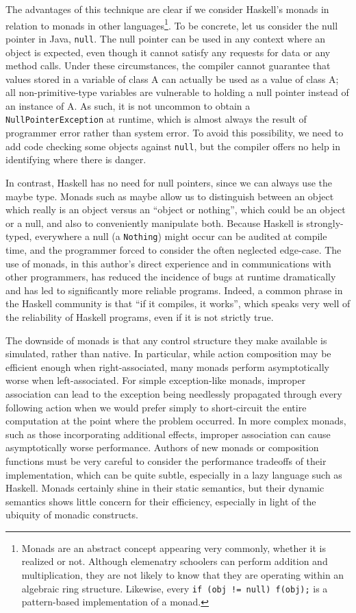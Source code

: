\documentclass[11pt]{article}
\begin{document}
The advantages of this technique are clear if we consider Haskell's monads in relation to monads in other languages\footnote{Monads are an abstract concept appearing very commonly, whether it is realized or not. Although elemenatry schoolers can perform addition and multiplication, they are not likely to know that they are operating within an algebraic ring structure. Likewise, every \texttt{if (obj != null) f(obj);} is a pattern-based implementation of a monad.}.
To be concrete, let us consider the null pointer in Java, \texttt{null}.
The null pointer can be used in any context where an object is expected, even though it cannot satisfy any requests for data or any method calls.
Under these circumstances, the compiler cannot guarantee that values stored in a variable of class A can actually be used as a value of class A; all non-primitive-type variables are vulnerable to holding a null pointer instead of an instance of A.
As such, it is not uncommon to obtain a \texttt{NullPointerException} at runtime, which is almost always the result of programmer error rather than system error.
To avoid this possibility, we need to add code checking some objects against \texttt{null}, but the compiler offers no help in identifying where there is danger.

In contrast, Haskell has no need for null pointers, since we can always use the maybe type.
Monads such as maybe allow us to distinguish between an object which really is an object versus an ``object or nothing'', which could be an object or a null, and also to conveniently manipulate both.
Because Haskell is strongly-typed, everywhere a null (a \texttt{Nothing}) might occur can be audited at compile time, and the programmer forced to consider the often neglected edge-case.
The use of monads, in this author's direct experience and in communications with other programmers, has reduced the incidence of bugs at runtime dramatically and has led to significantly more reliable programs.
Indeed, a common phrase in the Haskell community is that ``if it compiles, it works'', which speaks very well of the reliability of Haskell programs, even if it is not strictly true.


The downside of monads is that any control structure they make available is simulated, rather than native.
In particular, while action composition may be efficient enough when right-associated, many monads perform asymptotically worse when left-associated.\cite{ReflectionWithoutRemorse}
For simple exception-like monads, improper association can lead to the exception being needlessly propagated through every following action when we would prefer simply to short-circuit the entire computation at the point where the problem occurred.
In more complex monads, such as those incorporating additional effects, improper association can cause asymptotically worse performance.
Authors of new monads or composition functions must be very careful to consider the performance tradeoffs of their implementation, which can be quite subtle, especially in a lazy language such as Haskell.
Monads certainly shine in their static semantics, but their dynamic semantics shows little concern for their efficiency, especially in light of the ubiquity of monadic constructs.
\end{document}
